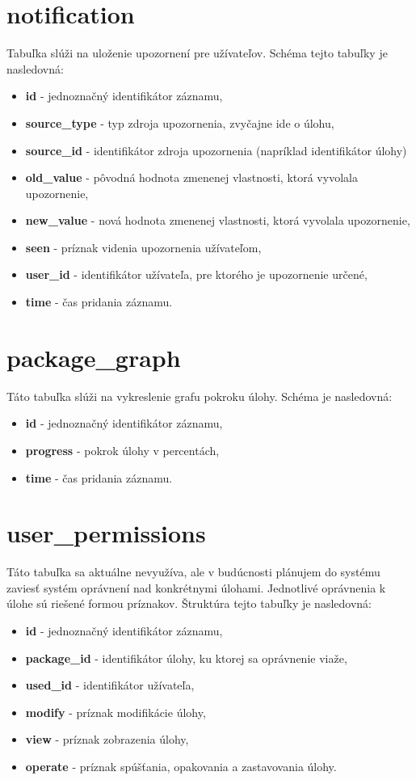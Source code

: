 \documentclass[zadani,slovak]{fitthesis}
\begin{document}
\section{notification}
Tabuľka slúži na uloženie upozornení pre užívateľov. Schéma tejto tabuľky je nasledovná:
\begin{itemize}
    \item \textbf {id} - jednoznačný identifikátor záznamu,
    \item \textbf {source\_type} - typ zdroja upozornenia, zvyčajne ide o úlohu,
    \item \textbf {source\_id} - identifikátor zdroja upozornenia (napríklad identifikátor úlohy)
    \item \textbf {old\_value} - pôvodná hodnota zmenenej vlastnosti, ktorá vyvolala upozornenie,
    \item \textbf {new\_value} - nová hodnota zmenenej vlastnosti, ktorá vyvolala upozornenie,
    \item \textbf {seen} - príznak videnia upozornenia užívateľom,
    \item \textbf {user\_id} - identifikátor užívateľa, pre ktorého je upozornenie určené,
    \item \textbf {time} - čas pridania záznamu.
\end{itemize}


\section{package\_graph}
Táto tabuľka slúži na vykreslenie grafu pokroku úlohy. Schéma je nasledovná:
\begin{itemize}
    \item \textbf {id} - jednoznačný identifikátor záznamu,
    \item \textbf {progress} - pokrok úlohy v percentách,
    \item \textbf {time} - čas pridania záznamu.
\end{itemize}


\section{user\_permissions}
Táto tabuľka sa aktuálne nevyužíva, ale v budúcnosti plánujem do systému zaviesť systém oprávnení nad konkrétnymi úlohami. Jednotlivé oprávnenia k úlohe sú riešené formou príznakov. Štruktúra tejto tabuľky je nasledovná:
\begin{itemize}
    \item \textbf {id} - jednoznačný identifikátor záznamu,
    \item \textbf {package\_id} - identifikátor úlohy, ku ktorej sa oprávnenie viaže,
    \item \textbf {used\_id} - identifikátor užívateľa,
    \item \textbf {modify} - príznak modifikácie úlohy,
    \item \textbf {view} - príznak zobrazenia úlohy,
    \item \textbf {operate} - príznak spúšťania, opakovania a zastavovania úlohy.
\end{itemize}
\end{document}
